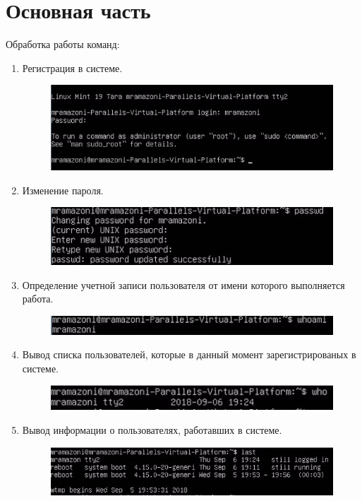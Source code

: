 \section{Основная часть}
	Обработка работы команд:
\begin{enumerate}
	\item Регистрация в системе.
	\begin{figure}[h]
		\includegraphics{lab1_2.png}
		\centering
	\end{figure}
	\newpage
	\item Изменение пароля.
	\begin{figure}[h]
		\includegraphics{lab1_3.png}
		\centering
	\end{figure}
	\item Определение учетной записи пользователя от имени которого выполняется работа.
	\begin{figure}[h]
		\includegraphics{lab1_4.png}
		\centering
	\end{figure}
	\item Вывод списка пользователей, которые в данный момент зарегистрированых в системе.
	\begin{figure}[h]
		\includegraphics{lab1_5.png}
		\centering
	\end{figure}
	\item Вывод информации о пользователях, работавших в системе.
	\begin{figure}[h]
		\includegraphics{lab1_6.png}

\end{figure}
\end{enumerate}
